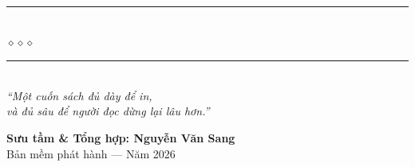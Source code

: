 \begin{titlepage}
\begin{center}
  {\color{midnightblue!55}\rule{7cm}{1pt}}\\[5pt]
  {\color{bronze!80!black}\large$\diamond$\hspace{1cm}$\diamond$\hspace{1cm}$\diamond$}\\[5pt]
  {\color{midnightblue!55}\rule{7cm}{1pt}}\\[1.25cm]

  {\normalsize\itshape\color{midnightblue!90!black}
  ``Một cuốn sách đủ dày để in,\\
   và đủ sâu để người đọc dừng lại lâu hơn.''}

  \vfill

  {\fontsize{16}{20}\selectfont\bfseries\color{midnightblue!90!black}
    Sưu tầm \& Tổng hợp: \textbf{Nguyễn Văn Sang}}\\[0.4cm]
  {\small\color{gray} Bản mềm phát hành --- Năm 2026}\\[0.5cm]
\end{center}

\afterpage{\nopagecolor}
\end{titlepage}